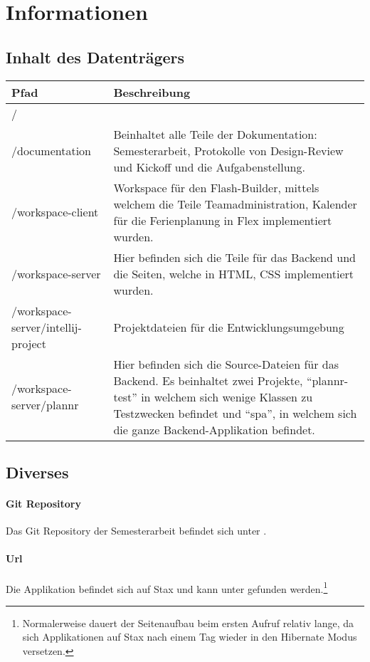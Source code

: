 \chapter{Informationen}
\section{Inhalt des Datentr\"agers}
\begin{longtable}{|p{6cm}|p{8cm}|}
\hline
\textbf{Pfad}&\textbf{Beschreibung}\\\hline
  / & \\\hline
  /documentation & Beinhaltet alle Teile der Dokumentation: Semesterarbeit, Protokolle von Design-Review und Kickoff und die Aufgabenstellung.\\\hline
  /workspace-client & Workspace f\"ur den Flash-Builder, mittels welchem die Teile Teamadministration, Kalender f\"ur die Ferienplanung in Flex implementiert wurden. \\\hline
  /workspace-server & Hier befinden sich die Teile f\"ur das Backend und die Seiten, welche in HTML, CSS implementiert wurden.\\\hline
 /workspace-server/intellij-project & Projektdateien f\"ur die Entwicklungsumgebung\\\hline
 /workspace-server/plannr & Hier befinden sich die Source-Dateien f\"ur das Backend. Es beinhaltet zwei Projekte, ``plannr-test'' in welchem sich wenige Klassen zu Testzwecken befindet und ``spa'', in welchem sich die ganze Backend-Applikation befindet. \\\hline
\end{longtable}
  

\section{Diverses}
\subsubsection{Git Repository}
Das Git Repository der Semesterarbeit befindet sich unter \cite{gitRepo}.

\subsubsection{Url}
Die Applikation befindet sich auf Stax und kann unter \cite{Plannr} gefunden werden.\footnote{Normalerweise dauert der Seitenaufbau beim ersten Aufruf relativ lange, da sich Applikationen auf Stax nach einem Tag wieder in den Hibernate Modus versetzen.}